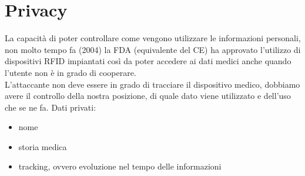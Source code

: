 \documentclass[oneside, 12pt]{extbook}
\begin{document}
\section{Privacy}
La capacità di poter controllare come vengono utilizzare le informazioni personali, non molto tempo fa (2004) la FDA (equivalente del CE) ha approvato l'utilizzo di dispositivi RFID impiantati così da poter accedere ai dati medici anche quando l'utente non è in grado di cooperare.\\L'attaccante non deve essere in grado di tracciare il dispositivo medico, dobbiamo avere il controllo della nostra posizione, di quale dato viene utilizzato e dell'uso che se ne fa. Dati privati:
\begin{itemize}
	\item nome
	\item storia medica
	\item tracking, ovvero evoluzione nel tempo delle informazioni
\end{itemize}
\end{document}
